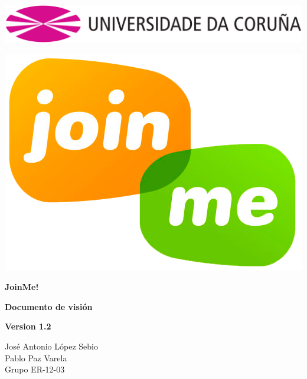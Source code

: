 \documentclass[12pt, a4paper, titlepage]{article}
\begin{document}

\begin{titlepage}

\includegraphics[width=15cm]{Imagenes/Simbolo_logo_UDC.png}

\vspace{3cm}

\begin{center}
\includegraphics[scale=0.3]{Imagenes/1a_Practica_ER_14-15.png}
\end{center}

\begin{flushright}
	
	\LARGE{\textbf{ JoinMe!}}
	
	\LARGE{\textbf{Documento de visión}}
	
	\large{\textbf{Version 1.2}}
\end{flushright}
\vspace{1cm}
\begin{center}
José Antonio López Sebio\\
Pablo Paz Varela\\
Grupo ER-12-03\\
\end{center}



\end{titlepage}
\end{document}
